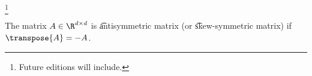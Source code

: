 
\footnote{Future editions will include.}


The matrix $A \in \R^{d \times d}$ is \t{antisymmetric matrix} (or \t{skew-symmetric matrix}) if $\transpose{A} = -A$.

\blankpage
